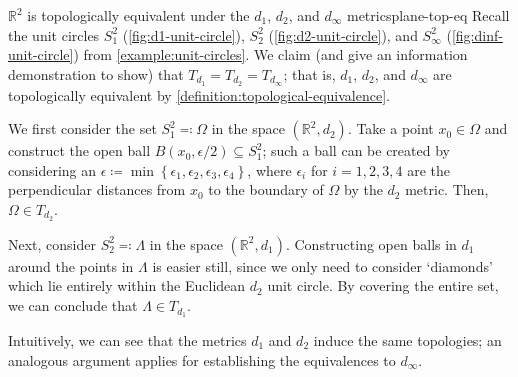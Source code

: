 \documentclass{article}
\numberwithin{equation}{section}
\numberwithin{figure}{section}
\begin{document}
\begin{example}{\texorpdfstring{$ \mathbb{R}^2 $}{The plane} is topologically
        equivalent under the \texorpdfstring{$ d_1 $, $ d_2 $, and $ d_\infty
        $}{standard} metrics}{plane-top-eq}
    Recall the unit circles $ S_1^2 $ (\cref{fig:d1-unit-circle}), $ S_2^2 $
    (\cref{fig:d2-unit-circle}), and $ S_\infty^2 $
    (\cref{fig:dinf-unit-circle}) from \cref{example:unit-circles}. We claim
    (and give an information demonstration to show) that $ T_{d_1} = T_{d_2} =
    T_{d_\infty} $; that is, $ d_1 $, $ d_2 $, and $ d_\infty $ are
    topologically equivalent by \cref{definition:topological-equivalence}.

    We first consider the set $ S_1^2 \eqcolon \Omega $ in the space $
    \left(\mathbb{R}^2, d_2\right) $. Take a point $ x_0 \in \Omega $ and
    construct the open ball $ B(x_0, \epsilon/2) \subseteq S_1^2 $; such a ball
    can be created by considering an $ \epsilon \coloneq \min\left\{ \epsilon_1,
    \epsilon_2, \epsilon_3, \epsilon_4 \right\} $, where $ \epsilon_i $ for $ i
    = 1, 2, 3, 4 $ are the perpendicular distances from $ x_0 $ to the boundary
    of $ \Omega $ by the $ d_2 $ metric. Then, $ \Omega \in T_{d_2} $.

    Next, consider $ S_2^2 \eqcolon \Lambda $ in the space $ \left(\mathbb{R}^2,
    d_1\right) $. Constructing open balls in $ d_1 $ around the points in $
    \Lambda $ is easier still, since we only need to consider `diamonds' which
    lie entirely within the Euclidean $ d_2 $ unit circle. By covering the
    entire set, we can conclude that $ \Lambda \in T_{d_1} $.

    Intuitively, we can see that the metrics $ d_1 $ and $ d_2 $ induce the same
    topologies; an analogous argument applies for establishing the equivalences
    to $ d_\infty $.


\end{example}
\end{document}
